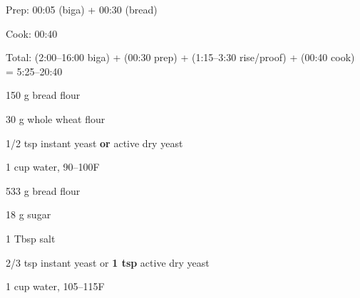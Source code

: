 \documentclass[oneside]{book}  %
\newcommand{\degF}{\textdegree F\xspace}
\begin{document}
\begin{timeline}
  \item[Prep:]  00:05 (biga) + 00:30 (bread)
  \item[Cook:]  00:40
  \item[Total:] (2:00--16:00 biga) + (00:30 prep) + (1:15--3:30 rise/proof)
    + (00:40 cook) = 5:25--20:40
\end{timeline}

\smallskip

\begin{twocols}
  \begin{ingredients}
    \item[150 g] bread flour
    \item[30 g] whole wheat flour
    \item[1/2 tsp] instant yeast \textbf{or} active dry yeast
    \item[1 cup] water, 90--100\degF
  \end{ingredients}

  \columnbreak

  \begin{ingredients}
    \item[533 g] bread flour
    \item[18 g] sugar
    \item[1 Tbsp] salt
    \item[2/3 tsp] instant yeast or \textbf{1 tsp} active dry yeast
    \item[1 cup] water, 105--115\degF
  \end{ingredients}
\end{twocols}
\end{document}
